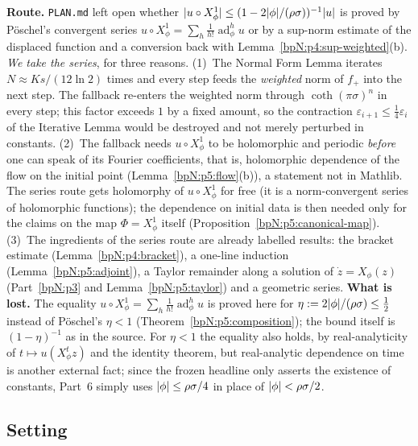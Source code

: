 \begin{remark}\label{bpN:p5:route}
\textbf{Route.} \texttt{PLAN.md} left open whether $\lvert u\circ X_\phi^1\rvert\le(1-2\lvert \phi\rvert/(\rho\sigma))^{-1}\lvert u\rvert$ is proved by P\"oschel's convergent series $u\circ X_\phi^1=\sum_h\frac1{h!}\operatorname{ad}_\phi^hu$ or by a sup-norm estimate of the displaced function and a conversion back with Lemma~\ref{bpN:p4:sup-weighted}(b).
\emph{We take the series}, for three reasons.
(1)~The Normal Form Lemma iterates $N\approx Ks/(12\ln2)$ times and every step feeds the \emph{weighted} norm of $f_+$ into the next step. The fallback re-enters the weighted norm through $\coth(\pi\sigma)^n$ in every step; this factor exceeds $1$ by a fixed amount, so the contraction $\varepsilon_{i+1}\le\frac14\varepsilon_i$ of the Iterative Lemma would be destroyed and not merely perturbed in constants.
(2)~The fallback needs $u\circ X_\phi^1$ to be holomorphic and periodic \emph{before} one can speak of its Fourier coefficients, that is, holomorphic dependence of the flow on the initial point (Lemma~\ref{bpN:p5:flow}(b)), a statement not in Mathlib. The series route gets holomorphy of $u\circ X_\phi^1$ for free (it is a norm-convergent series of holomorphic functions); the dependence on initial data is then needed only for the claims on the map $\Phi=X^1_\phi$ itself (Proposition~\ref{bpN:p5:canonical-map}).
(3)~The ingredients of the series route are already labelled results: the bracket estimate (Lemma~\ref{bpN:p4:bracket}), a one-line induction (Lemma~\ref{bpN:p5:adjoint}), a Taylor remainder along a solution of $\dot z=X_\phi(z)$ (Part~\ref{bpN:p3} and Lemma~\ref{bpN:p5:taylor}) and a geometric series.
\textbf{What is lost.} The equality $u\circ X^1_\phi=\sum_h\frac1{h!}\operatorname{ad}^h_\phi u$ is proved here for $\eta:=2\lvert \phi\rvert/(\rho\sigma)\le\frac12$ instead of P\"oschel's $\eta<1$ (Theorem~\ref{bpN:p5:composition}); the bound itself is $(1-\eta)^{-1}$ as in the source. For $\eta<1$ the equality also holds, by real-analyticity of $t\mapsto u(X^t_\phi z)$ and the identity theorem, but real-analytic dependence on time is another external fact; since the frozen headline only asserts the existence of constants, Part~6 simply uses $\lvert \phi\rvert\le\rho\sigma/4$ in place of $\lvert \phi\rvert<\rho\sigma/2$.
\end{remark}

\subsection{Setting}\label{bpN:p5:s-setting}


